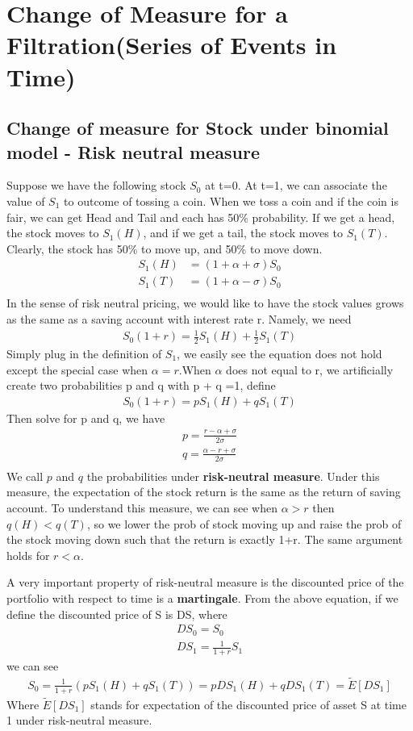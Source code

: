 \documentclass[a4paper]{article}
\begin{document}
\section{Change of Measure for a Filtration(Series of Events in Time)}
\subsection{Change of measure for Stock under binomial model - Risk neutral measure}
Suppose we have the following stock $S_0$ at t=0. At t=1, we can associate the value of $S_1$ to outcome of tossing a coin. When we toss a coin and if the coin is fair, we can get Head and Tail and each has 50\% probability. If we get a head, the stock moves to $S_1(H)$, and if we get a tail, the stock moves to $S_1(T)$. Clearly, the stock has 50\% to move up, and 50\% to move down.
\begin{align*}
S_1(H) & = (1+\alpha + \sigma) S_0\\  
S_1(T) & = (1+\alpha - \sigma) S_0\\     
\end{align*}
In the sense of risk neutral pricing, we would like to have the stock values grows as the same as a saving account with interest rate r.  Namely, we need
\begin{align*}
S_0 (1+r) = \frac{1}{2}S_1(H) + \frac{1}{2} S_1(T) 
\end{align*}
Simply plug in the definition of $S_1$, we easily see the equation does not hold except the special case when $\alpha = r$.When $\alpha$ does not equal to r, we artificially create two probabilities p and q with p + q =1, 
define 
\begin{align*}
S_0 (1+r) = p S_1(H) + q S_1(T) 	
\end{align*}
Then solve for p and q, we have
\begin{align*}
p= \frac{r - \alpha + \sigma}{2 \sigma} \\
q= \frac{\alpha - r + \sigma}{2 \sigma} \\
\end{align*}
We call $p$ and $q$ the probabilities under {\bf risk-neutral measure}. Under this measure, the expectation of the stock return is the same as the return of saving account. To understand this measure, we can see when $\alpha > r$ then $q(H)< q(T)$, so we lower the prob of stock moving up and raise the prob of the stock moving down such that the return is exactly 1+r. The same argument holds for $r < \alpha$. 

A very important property of risk-neutral measure is the discounted price of the portfolio with respect to time is a {\bf martingale}. From the above equation, if we define the discounted price of S is DS, where 
\begin{align*}
DS_0 = S_0\\
DS_1 = \frac{1}{1+r} S_1
\end{align*}
we can see
\begin{align*}
S_0 = \frac{1}{1+r} (p S_1(H) + q S_1(T)) = p DS_1(H) + q DS_1(T) = \tilde E[DS_1]
\end{align*}
Where $\tilde E[DS_1]$ stands for expectation of the discounted price of asset S at time 1 under risk-neutral measure.\\
\end{document}
